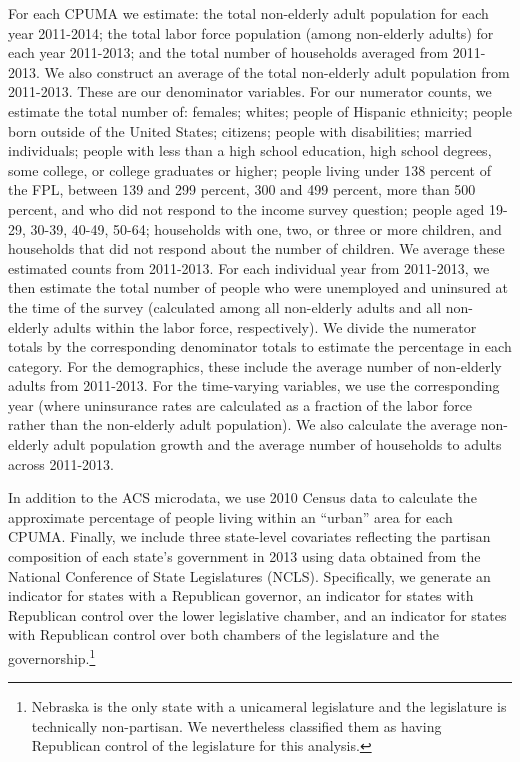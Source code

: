 \documentclass[aoas]{imsart}
\theoremstyle{plain}
\theoremstyle{remark}
\begin{document}
For each CPUMA we estimate: the total non-elderly adult population for each year 2011-2014; the total labor force population (among non-elderly adults) for each year 2011-2013; and the total number of households averaged from 2011-2013. We also construct an average of the total non-elderly adult population from 2011-2013. These are our denominator variables. For our numerator counts, we estimate the total number of: females; whites; people of Hispanic ethnicity; people born outside of the United States; citizens; people with disabilities; married individuals; people with less than a high school education, high school degrees, some college, or college graduates or higher; people living under 138 percent of the FPL, between 139 and 299 percent, 300 and 499 percent, more than 500 percent, and who did not respond to the income survey question; people aged 19-29, 30-39, 40-49, 50-64; households with one, two, or three or more children, and households that did not respond about the number of children. We average these estimated counts from 2011-2013. For each individual year from 2011-2013, we then estimate the total number of people who were unemployed and uninsured at the time of the survey (calculated among all non-elderly adults and all non-elderly adults within the labor force, respectively). We divide the numerator totals by the corresponding denominator totals to estimate the percentage in each category. For the demographics, these include the average number of non-elderly adults from 2011-2013. For the time-varying variables, we use the corresponding year (where uninsurance rates are calculated as a fraction of the labor force rather than the non-elderly adult population). We also calculate the average non-elderly adult population growth and the average number of households to adults across 2011-2013. 

In addition to the ACS microdata, we use 2010 Census data to calculate the approximate percentage of people living within an ``urban'' area for each CPUMA. Finally, we include three state-level covariates reflecting the partisan composition of each state's government in 2013 using data obtained from the National Conference of State Legislatures (NCLS). Specifically, we generate an indicator for states with a Republican governor, an indicator for states with Republican control over the lower legislative chamber, and an indicator for states with Republican control over both chambers of the legislature and the governorship.\footnote{Nebraska is the only state with a unicameral legislature and the legislature is technically non-partisan. We nevertheless classified them as having Republican control of the legislature for this analysis.} 
\end{document}
